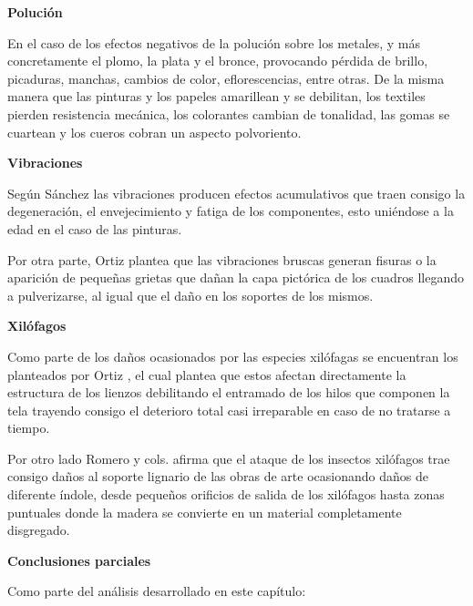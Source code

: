     \textbf{Polución}

    En el caso de los efectos negativos de la polución sobre los metales, y más concretamente el plomo, la plata y el bronce, provocando pérdida de brillo, picaduras, manchas, cambios de color, eflorescencias, entre otras.
    De la misma manera que las pinturas y los papeles amarillean y se debilitan, los textiles pierden resistencia mecánica, los colorantes cambian de tonalidad, las gomas se cuartean y los cueros cobran un aspecto polvoriento.\cite{tapolComoAfrontarPolucion2001}

    \textbf{Vibraciones}

    Según Sánchez \cite{sanchezPinturaSobreTabla2015} las vibraciones producen efectos acumulativos que traen consigo la degeneración, el envejecimiento y fatiga de los componentes, esto uniéndose a la edad en el caso de las pinturas.

    Por otra parte, Ortiz \cite{ortizRestauracionObrasArte2012} plantea que las vibraciones bruscas generan fisuras o la aparición de pequeñas grietas que dañan la capa pictórica de los cuadros llegando a pulverizarse, al igual que el daño en los soportes de los mismos.

    \textbf{Xilófagos}

    Como parte de los daños ocasionados por las especies xilófagas se encuentran los planteados por Ortiz \cite{ortizRestauracionObrasArte2012}, el cual plantea que estos afectan directamente la estructura de los lienzos debilitando el entramado de los hilos que componen la tela trayendo consigo el deterioro total casi irreparable en caso de no tratarse a tiempo.

    Por otro lado Romero y cols. \cite{ferrerasromeroVirgenConNino2011} afirma que el ataque de los insectos xilófagos trae consigo daños al soporte lignario de las obras de arte ocasionando daños de diferente índole, desde pequeños orificios de salida de los xilófagos hasta zonas puntuales donde la madera se convierte en un material completamente disgregado.

    \newpage

    \textbf{\large Conclusiones parciales}

    Como parte del análisis desarrollado en este capítulo:
    
